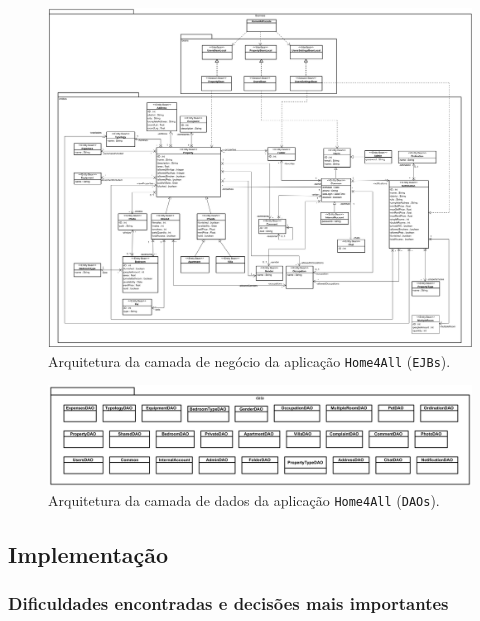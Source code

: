 \begin{figure}[H]
    \centering
    \includegraphics[width=1\textwidth]{images/PSM_Business.png}
    \caption{Arquitetura da camada de negócio da aplicação \texttt{Home4All} (\texttt{EJBs}).}
    \label{fig:psm_business}
\end{figure}

\begin{figure}[H]
    \centering
    \includegraphics[width=1\textwidth]{images/PSM_Data.png}
    \caption{Arquitetura da camada de dados da aplicação \texttt{Home4All} (\texttt{DAOs}).}
    \label{fig:psm_data}
\end{figure}



\subsection{Implementação}


\subsubsection{Dificuldades encontradas e decisões mais importantes}

